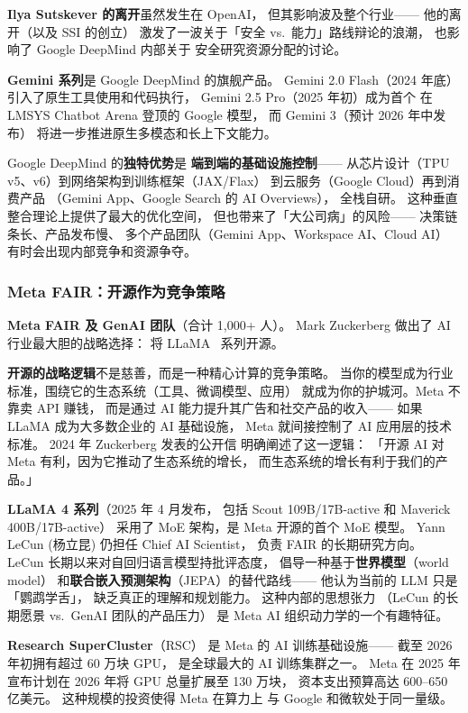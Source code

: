 \textbf{Ilya Sutskever 的离开}虽然发生在 OpenAI，
但其影响波及整个行业——
他的离开（以及 SSI 的创立）
激发了一波关于「安全 vs.\ 能力」路线辩论的浪潮，
也影响了 Google DeepMind 内部关于
安全研究资源分配的讨论。

\textbf{Gemini 系列}是 Google DeepMind 的旗舰产品。
Gemini 2.0 Flash（2024 年底）引入了原生工具使用和代码执行，
Gemini 2.5 Pro（2025 年初）成为首个
在 LMSYS Chatbot Arena 登顶的 Google 模型，
而 Gemini 3（预计 2026 年中发布）
将进一步推进原生多模态和长上下文能力。

Google DeepMind 的\textbf{独特优势}是
\textbf{端到端的基础设施控制}——
从芯片设计（TPU v5、v6）到网络架构到训练框架（JAX/Flax）
到云服务（Google Cloud）再到消费产品
（Gemini App、Google Search 的 AI Overviews），
全栈自研。
这种垂直整合理论上提供了最大的优化空间，
但也带来了「大公司病」的风险——
决策链条长、产品发布慢、
多个产品团队（Gemini App、Workspace AI、Cloud AI）
有时会出现内部竞争和资源争夺。

\subsubsection{Meta FAIR：开源作为竞争策略}

\textbf{Meta FAIR 及 GenAI 团队}（合计 1,000+ 人）。
Mark Zuckerberg 做出了 AI 行业最大胆的战略选择：
将 LLaMA~\cite{touvron2023llama,dubey2024llama3} 系列开源。

\textbf{开源的战略逻辑}不是慈善，而是一种精心计算的竞争策略。
当你的模型成为行业标准，围绕它的生态系统（工具、微调模型、应用）
就成为你的护城河。Meta 不靠卖 API 赚钱，
而是通过 AI 能力提升其广告和社交产品的收入——
如果 LLaMA 成为大多数企业的 AI 基础设施，
Meta 就间接控制了 AI 应用层的技术标准。
2024 年 Zuckerberg 发表的公开信
明确阐述了这一逻辑：
「开源 AI 对 Meta 有利，因为它推动了生态系统的增长，
而生态系统的增长有利于我们的产品。」

\textbf{LLaMA 4 系列}（2025 年 4 月发布，
包括 Scout 109B/17B-active 和 Maverick 400B/17B-active）
采用了 MoE 架构，是 Meta 开源的首个 MoE 模型。
Yann LeCun (杨立昆) 仍担任 Chief AI Scientist，
负责 FAIR 的长期研究方向。
LeCun 长期以来对自回归语言模型持批评态度，
倡导一种基于\textbf{世界模型}（world model）
和\textbf{联合嵌入预测架构}（JEPA）的替代路线——
他认为当前的 LLM 只是「鹦鹉学舌」，
缺乏真正的理解和规划能力。
这种内部的思想张力
（LeCun 的长期愿景 vs.\ GenAI 团队的产品压力）
是 Meta AI 组织动力学的一个有趣特征。

\textbf{Research SuperCluster}（RSC）
是 Meta 的 AI 训练基础设施——
截至 2026 年初拥有超过 60 万块 GPU，
是全球最大的 AI 训练集群之一。
Meta 在 2025 年宣布计划在 2026 年将
GPU 总量扩展至 130 万块，
资本支出预算高达 600--650 亿美元。
这种规模的投资使得 Meta 在算力上
与 Google 和微软处于同一量级。

